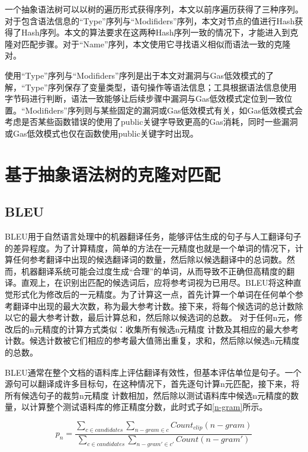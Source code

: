 一个抽象语法树可以以树的遍历形式获得序列，本文以前序遍历获得了三种序列。对于包含语法信息的“Type”序列与“Modifiders”序列，本文对节点的值进行Hash获得了Hash序列。本文的算法要求在这两种Hash序列一致的情况下，才能进入到克隆对匹配步骤。对于“Name”序列，本文使用它寻找语义相似而语法一致的克隆对。

使用“Type”序列与“Modifiders”序列是出于本文对漏洞与Gas低效模式的了解，“Type”序列保存了变量类型，语句操作等语法信息；工具根据语法信息使用字节码进行判断，语法一致能够让后续步骤中漏洞与Gas低效模式定位到一致位置。“Modifiders”序列则与某些固定的漏洞或Gas低效模式有关，如Gas低效模式会考虑是否某些函数错误的使用了public关键字导致更高的Gas消耗，同时一些漏洞或Gas低效模式也仅在函数使用public关键字时出现。

\section{基于抽象语法树的克隆对匹配}

\subsection{\label{BLEU}BLEU}

BLEU\cite{bleu}用于自然语言处理中的机器翻译任务，能够评估生成的句子与人工翻译句子的差异程度。为了计算精度，简单的方法在一元精度也就是一个单词的情况下，计算任何参考翻译中出现的候选翻译词的数量，然后除以候选翻译中的总词数。然而，机器翻译系统可能会过度生成“合理”的单词，从而导致不正确但高精度的翻译。直观上，在识别出匹配的候选词后，应将参考词视为已用尽。BLEU将这种直觉形式化为修改后的一元精度。为了计算这一点，首先计算一个单词在任何单个参考翻译中出现的最大次数，称为最大参考计数。接下来，将每个候选词的总计数除以它的最大参考计数，最后计算总和，然后除以候选词的总数。
对于任何n元，修改后的n元精度的计算方式类似：收集所有候选n元精度 计数及其相应的最大参考计数。候选计数被它们相应的参考最大值筛出重复，求和，然后除以候选n元精度的总数\cite{bleu}。

BLEU通常在整个文档的语料库上评估翻译有效性，但基本评估单位是句子。一个源句可以翻译成许多目标句，在这种情况下，首先逐句计算n元匹配，接下来，将所有候选句子的裁剪n元精度 计数相加，然后除以测试语料库中候选n元精度的数量，以计算整个测试语料库的修正精度分数，此时式子如\ref{n-gram}所示。

\begin{equation}
p_{n} = \frac{\sum_{c\in candidates}\sum_{n-gram\in c} Count_{clip}\left ( n-gram\right )}{\sum_{c\in candidates}\sum_{n-gram'\in c'} Count\left ( n-gram'\right )}
\label{n-gram}
\end{equation}

